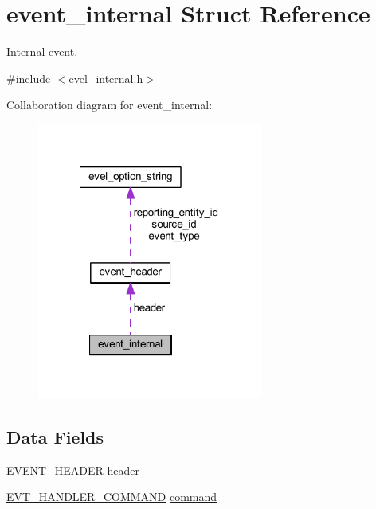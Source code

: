 \hypertarget{structevent__internal}{}\section{event\+\_\+internal Struct Reference}
\label{structevent__internal}


Internal event.  




{\ttfamily \#include $<$evel\+\_\+internal.\+h$>$}



Collaboration diagram for event\+\_\+internal\+:
\nopagebreak
\begin{figure}[H]
\begin{center}
\leavevmode
\includegraphics[width=210pt]{structevent__internal__coll__graph}
\end{center}
\end{figure}
\subsection*{Data Fields}
\begin{DoxyCompactItemize}
\item 
\hyperlink{evel_8h_aa0ea94c675729365ea7825c4fc7e06d8}{E\+V\+E\+N\+T\+\_\+\+H\+E\+A\+D\+ER} \hyperlink{structevent__internal_a9bc97bfd3fc7deffd3df855e7e814645}{header}
\item 
\hyperlink{evel__internal_8h_a54a85a3e4ac8075dd263aa69a7b32ba9}{E\+V\+T\+\_\+\+H\+A\+N\+D\+L\+E\+R\+\_\+\+C\+O\+M\+M\+A\+ND} \hyperlink{structevent__internal_a7aabad85d349fa4a2d8cefe380fca9de}{command}
\end{DoxyCompactItemize}


